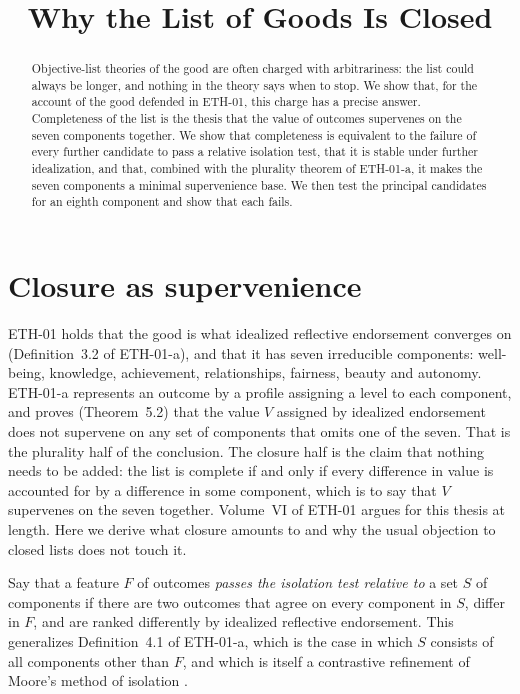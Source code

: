 \documentclass{situationist-preprint}
\title{Why the List of Goods Is Closed}
\begin{document}
\maketitle

\begin{abstract}
Objective-list theories of the good are often charged with arbitrariness: the list could always be longer, and nothing in the theory says when to stop. We show that, for the account of the good defended in ETH-01, this charge has a precise answer. Completeness of the list is the thesis that the value of outcomes supervenes on the seven components together. We show that completeness is equivalent to the failure of every further candidate to pass a relative isolation test, that it is stable under further idealization, and that, combined with the plurality theorem of ETH-01-a, it makes the seven components a minimal supervenience base. We then test the principal candidates for an eighth component and show that each fails.
\end{abstract}

\section{Closure as supervenience}

ETH-01 holds that the good is what idealized reflective endorsement converges on (Definition~3.2 of ETH-01-a), and that it has seven irreducible components: well-being, knowledge, achievement, relationships, fairness, beauty and autonomy. ETH-01-a represents an outcome by a profile assigning a level to each component, and proves (Theorem~5.2) that the value $V$ assigned by idealized endorsement does not supervene on any set of components that omits one of the seven. That is the plurality half of the conclusion. The closure half is the claim that nothing needs to be added: the list is complete if and only if every difference in value is accounted for by a difference in some component, which is to say that $V$ supervenes on the seven together. Volume~VI of ETH-01 argues for this thesis at length. Here we derive what closure amounts to and why the usual objection to closed lists does not touch it.

Say that a feature $F$ of outcomes \emph{passes the isolation test relative to} a set $S$ of components if there are two outcomes that agree on every component in $S$, differ in $F$, and are ranked differently by idealized reflective endorsement. This generalizes Definition~4.1 of ETH-01-a, which is the case in which $S$ consists of all components other than $F$, and which is itself a contrastive refinement of Moore's method of isolation \citep[\S 112]{Moore1903}.
\end{document}
